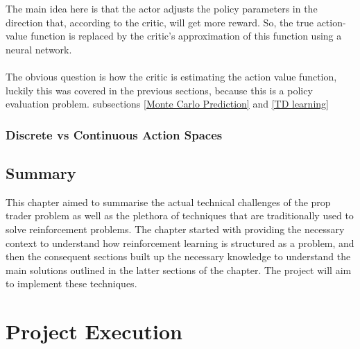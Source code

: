 \documentclass[ %
                    author={Ashwinder Khurana},
                supervisor={Prof Dave Cliff},
                    degree={MEng},
                     title={The Deeply Reinforced Trader},
                  subtitle={},
                      type={enterprise},
                      year={2020} ]{dissertation}
\begin{document}
{\noindent
The main idea here is that the actor adjusts the policy parameters in the direction that, according to the critic, will get more reward. So, the true action-value function is replaced by the critic's approximation of this function using a neural network. 
\\
\\
\noindent
The obvious question is how the critic is estimating the action value function, luckily this was covered in the previous sections, because this is a policy evaluation problem. subsections \ref{Monte Carlo Prediction} and \ref{TD learning}

%
\subsection{Discrete vs Continuous Action Spaces}

\section{Summary}
This chapter aimed to summarise the actual technical challenges of the prop trader problem as well as the plethora of techniques that are traditionally used to solve reinforcement problems. The chapter started with providing the necessary context to understand how reinforcement learning is structured as a problem, and then the consequent sections built up the necessary knowledge to understand the main solutions outlined in the latter sections of the chapter. The project will aim to implement these techniques. 


\chapter{Project Execution}
\label{chap:execution}

}
\end{document}
